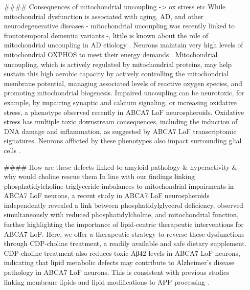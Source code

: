 #### Consequences of mitochondrial uncoupling -> ox stress etc 
While mitochondrial dysfunction is associated with aging, AD, and other neurodegenerative diseases - mitochondrial uncoupling was recently linked to frontotemporal dementia variants\cite{noauthor_2022-os} -, little is known about the role of mitochondrial uncoupling in AD etiology \cite{Bano2023-qz,Zong2024-tn,Demine2019-qj,noauthor_2013-rt,Picca2023-gt}. Neurons maintain very high levels of mitochondrial OXPHOS to meet their energy demands\cite{Morant-Ferrando2023-va,Trigo2022-ym} . Mitochondrial uncoupling, which is actively regulated by mitochondrial proteins\cite{Park2023-fa,noauthor_2016-fg}, may help sustain this high aerobic capacity by actively controlling the mitochondrial membrane potential, managing associated levels of reactive oxygen species\cite{Demine2019-qj,Shadel2015-kt}, and promoting mitochondrial biogenesis\cite{Korshunov1997-aj,Wisloff2005-ho,Andrews2005-yy,noauthor_2022-vx}. Impaired uncoupling can be neurotoxic\cite{Korshunov1997-aj,Wisloff2005-ho,Andrews2005-yy,noauthor_2022-vx}, for example, by impairing synaptic and calcium signaling, or increasing  oxidative stress, a phenotype observed recently in ABCA7 LoF neurospheroids\cite{Kawatani2023-vf}. Oxidative stress has multiple toxic downstream consequences, including the induction of DNA damage and inflammation, as suggested by ABCA7 LoF transcriptomic signatures\cite{Robert2020-sc,Volanti2002-mc,Canty1999-oj,Schreck1992-zr}. Neurons afflicted by these phenotypes also impact surrounding glial cells \cite{Byrns2024-id,Welch2022-ef}. 

#### How are these defects linked to amyloid pathology & hyperactivity & why would choline rescue them
In line with our findings linking phosphatidylcholine-triglyceride imbalances to mitochondrial impairments in ABCA7 LoF neurons, a recent study in ABCA7 LoF neurospheroids independently revealed a link between phosphatidylglycerol deficiency, observed simultaneously with reduced phosphatidylcholine, and mitochondrial function\cite{Kawatani2023-vf}, further highlighting the importance of lipid-centric therapeutic interventions for ABCA7 LoF. Here, we offer a therapeutic strategy to reverse these dysfunctions through CDP-choline treatment, a readily available and safe dietary supplement\cite{Gavrilova2018-oi,Zeisel2009-xv,Blusztajn2017-nv}. CDP-choline treatment also reduces toxic Aβ42 levels in ABCA7 LoF neurons, indicating that lipid metabolic defects may contribute to Alzheimer’s disease pathology in ABCA7 LoF neurons. This is consistent with previous studies linking membrane lipids and lipid modifications to APP processing \cite{Bhattacharyya2016-rs,Walter2013-qu}. 

